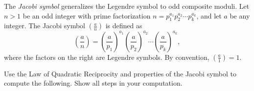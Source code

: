 \documentclass[12pt]{exam}
\begin{document}
\begin{questions}
\question[1] The \emph{Jacobi symbol} generalizes the Legendre symbol to odd composite moduli. Let $n > 1$ be an odd integer with prime factorization $n = p_1^{a_1} p_2^{a_2} \cdots p_k^{a_k}$, and let $a$ be any integer. The Jacobi symbol $\left(\frac{a}{n}\right)$ is defined as
$$\left(\frac{a}{n}\right) = \left(\frac{a}{p_1}\right)^{a_1} \left(\frac{a}{p_2}\right)^{a_2} \cdots \left(\frac{a}{p_k}\right)^{a_k},$$
where the factors on the right are Legendre symbols. By convention, $\left(\frac{a}{1}\right) = 1$.



\question[1] Use the Law of Quadratic Reciprocity and properties of the Jacobi symbol to compute the following. Show all steps in your computation.


\end{questions}
\end{document}
